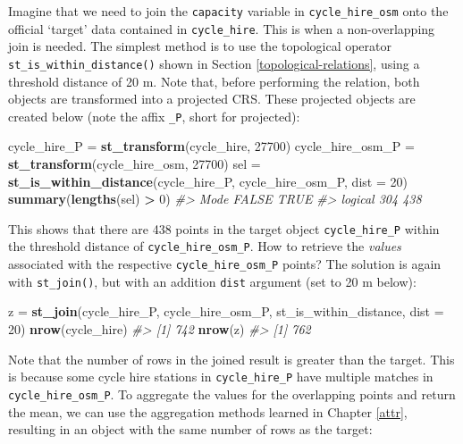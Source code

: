 \documentclass[]{krantz}
\newenvironment{Shaded}{\begin{snugshade}}{\end{snugshade}}
\newcommand{\CommentTok}[1]{\textcolor[rgb]{0.37,0.37,0.37}{\textit{#1}}}
\newcommand{\DataTypeTok}[1]{\textcolor[rgb]{0.27,0.27,0.27}{#1}}
\newcommand{\DecValTok}[1]{\textcolor[rgb]{0.06,0.06,0.06}{#1}}
\newcommand{\KeywordTok}[1]{\textcolor[rgb]{0.27,0.27,0.27}{\textbf{#1}}}
\newcommand{\NormalTok}[1]{#1}
\newcommand{\OperatorTok}[1]{\textcolor[rgb]{0.43,0.43,0.43}{\textbf{#1}}}
\newcommand{\StringTok}[1]{\textcolor[rgb]{0.5,0.5,0.5}{#1}}
\begin{document}
Imagine that we need to join the \texttt{capacity} variable in \texttt{cycle\_hire\_osm} onto the official `target' data contained in \texttt{cycle\_hire}.
This is when a non-overlapping join is needed.
The simplest method is to use the topological operator \texttt{st\_is\_within\_distance()} shown in Section \ref{topological-relations}, using a threshold distance of 20 m.
Note that, before performing the relation, both objects are transformed into a projected CRS.
These projected objects are created below (note the affix \texttt{\_P}, short for projected):

\begin{Shaded}
\begin{Highlighting}[]
\NormalTok{cycle_hire_P =}\StringTok{ }\KeywordTok{st_transform}\NormalTok{(cycle_hire, }\DecValTok{27700}\NormalTok{)}
\NormalTok{cycle_hire_osm_P =}\StringTok{ }\KeywordTok{st_transform}\NormalTok{(cycle_hire_osm, }\DecValTok{27700}\NormalTok{)}
\NormalTok{sel =}\StringTok{ }\KeywordTok{st_is_within_distance}\NormalTok{(cycle_hire_P, cycle_hire_osm_P, }\DataTypeTok{dist =} \DecValTok{20}\NormalTok{)}
\KeywordTok{summary}\NormalTok{(}\KeywordTok{lengths}\NormalTok{(sel) }\OperatorTok{>}\StringTok{ }\DecValTok{0}\NormalTok{)}
\CommentTok{#>    Mode   FALSE    TRUE }
\CommentTok{#> logical     304     438}
\end{Highlighting}
\end{Shaded}

This shows that there are 438 points in the target object \texttt{cycle\_hire\_P} within the threshold distance of \texttt{cycle\_hire\_osm\_P}.
How to retrieve the \emph{values} associated with the respective \texttt{cycle\_hire\_osm\_P} points?
The solution is again with \texttt{st\_join()}, but with an addition \texttt{dist} argument (set to 20 m below):

\begin{Shaded}
\begin{Highlighting}[]
\NormalTok{z =}\StringTok{ }\KeywordTok{st_join}\NormalTok{(cycle_hire_P, cycle_hire_osm_P, st_is_within_distance, }\DataTypeTok{dist =} \DecValTok{20}\NormalTok{)}
\KeywordTok{nrow}\NormalTok{(cycle_hire)}
\CommentTok{#> [1] 742}
\KeywordTok{nrow}\NormalTok{(z)}
\CommentTok{#> [1] 762}
\end{Highlighting}
\end{Shaded}

Note that the number of rows in the joined result is greater than the target.
This is because some cycle hire stations in \texttt{cycle\_hire\_P} have multiple matches in \texttt{cycle\_hire\_osm\_P}.
To aggregate the values for the overlapping points and return the mean, we can use the aggregation methods learned in Chapter \ref{attr}, resulting in an object with the same number of rows as the target:
\end{document}
